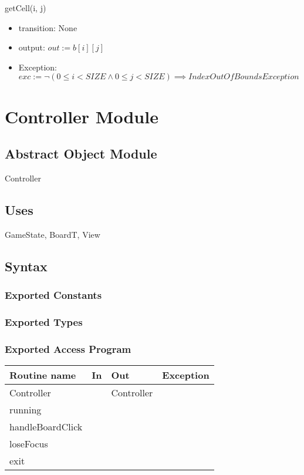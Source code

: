 \documentclass[11pt]{article}
\begin{document}
\begin{itemize}
getCell(i, j)
\begin{itemize}
\item transition: None
\item output: \(out := b[i][j]\)
\item Exception: \(exc := ¬ (0 \leq i < SIZE \land 0 \leq j < SIZE) \implies IndexOutOfBoundsException\)
\end{itemize}
\end{itemize}

\section{Controller Module}
\label{sec:org87fb6a9}
\subsection*{Abstract Object Module}
\label{sec:orgde1bb36}
Controller
\subsection*{Uses}
\label{sec:org9ec7130}
GameState, BoardT, View
\subsection*{Syntax}
\label{sec:orgce2002f}
\subsubsection*{Exported Constants}
\label{sec:org85d3f8d}
\subsubsection*{Exported Types}
\label{sec:org99ef4d4}
\subsubsection*{Exported Access Program}
\label{sec:org93553bb}
\begin{center}
\begin{tabular}{l|l|l|l}
Routine name & In & Out & Exception\\
\hline
Controller &  & Controller & \\
running &  &  & \\
handleBoardClick &  &  & \\
loseFocus &  &  & \\
exit &  &  & \\
\end{tabular}
\end{center}
\end{document}
